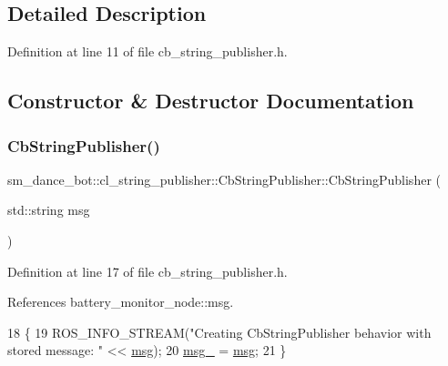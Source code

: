 \subsection{Detailed Description}


Definition at line 11 of file cb\+\_\+string\+\_\+publisher.\+h.



\subsection{Constructor \& Destructor Documentation}
\mbox{\label{classsm__dance__bot_1_1cl__string__publisher_1_1CbStringPublisher_abe08b99960be5c26acce0cb062ceea5f}} 
\subsubsection{\texorpdfstring{Cb\+String\+Publisher()}{CbStringPublisher()}}
{\footnotesize\ttfamily sm\+\_\+dance\+\_\+bot\+::cl\+\_\+string\+\_\+publisher\+::\+Cb\+String\+Publisher\+::\+Cb\+String\+Publisher (\begin{DoxyParamCaption}\item[{std\+::string}]{msg }\end{DoxyParamCaption})\hspace{0.3cm}{\ttfamily [inline]}}



Definition at line 17 of file cb\+\_\+string\+\_\+publisher.\+h.



References battery\+\_\+monitor\+\_\+node\+::msg.


\begin{DoxyCode}
18     \{
19         ROS\_INFO\_STREAM(\textcolor{stringliteral}{"Creating CbStringPublisher behavior with stored message: "} << 
      \hyperlink{namespacebattery__monitor__node_ab1920c64448816edd4064e494275fdff}{msg});
20         \hyperlink{classsm__dance__bot_1_1cl__string__publisher_1_1CbStringPublisher_a320ff6940dc15b469af3679d2d2eb655}{msg\_} = \hyperlink{namespacebattery__monitor__node_ab1920c64448816edd4064e494275fdff}{msg};
21     \}
\end{DoxyCode}


